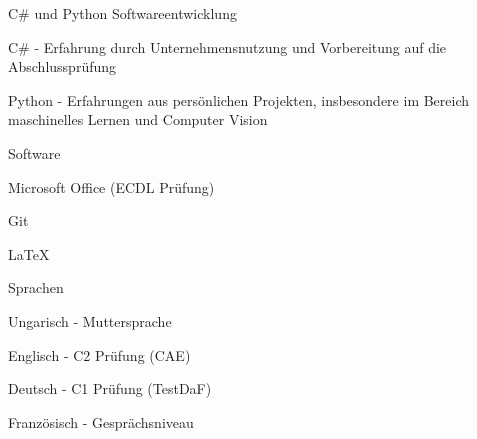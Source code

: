 

\begin{cventries}

  \cventry
    {} %
    {C\# und Python Softwareentwicklung} %
    {} %
    {} %
    {
      \begin{cvitems} %
        \item {C\# - Erfahrung durch Unternehmensnutzung und Vorbereitung auf die Abschlussprüfung} 
        \item {Python - Erfahrungen aus persönlichen Projekten, insbesondere im Bereich maschinelles Lernen und Computer Vision}
      \end{cvitems}
    }

    
    
\cventry
    {} %
    {Software} %
    {} %
    {} %
    {
      \begin{cvitems} %
        \item {Microsoft Office (ECDL Prüfung)}
        \item {Git}
        \item {\LaTeX}
      \end{cvitems}
    }
    
\cventry
    {} %
    {Sprachen} %
    {} %
    {} %
    {
      \begin{cvitems} %
        \item {Ungarisch - Muttersprache}
        \item {Englisch - C2 Prüfung (CAE)}
        \item {Deutsch - C1 Prüfung (TestDaF)}
        \item {Französisch - Gesprächsniveau}
      \end{cvitems}
    }    
\end{cventries}
